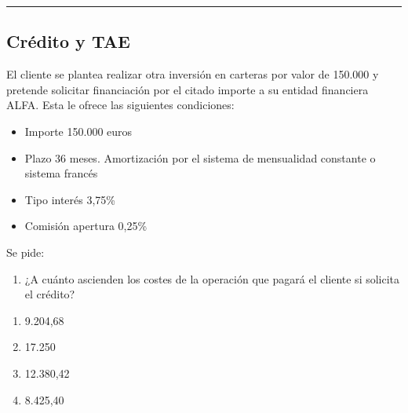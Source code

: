 \documentclass[
  letterpaper,
  DIV=11,
  numbers=noendperiod]{scrartcl}
\providecommand{\tightlist}{%
  \setlength{\itemsep}{0pt}\setlength{\parskip}{0pt}}\usepackage{longtable,booktabs,array}
\begin{document}
\begin{center}\rule{0.5\linewidth}{0.5pt}\end{center}

\hypertarget{cruxe9dito-y-tae}{%
\subsection{Crédito y TAE}\label{cruxe9dito-y-tae}}

El cliente se plantea realizar otra inversión en carteras por valor de
150.000 y pretende solicitar financiación por el citado importe a su
entidad financiera ALFA. Esta le ofrece las siguientes condiciones:

\begin{itemize}
\item
  Importe 150.000 euros
\item
  Plazo 36 meses. Amortización por el sistema de mensualidad constante o
  sistema francés
\item
  Tipo interés 3,75\%
\item
  Comisión apertura 0,25\%
\end{itemize}

Se pide:

\begin{enumerate}
\def\labelenumi{\arabic{enumi}.}
\tightlist
\item
  ¿A cuánto ascienden los costes de la operación que pagará el cliente
  si solicita el crédito?
\end{enumerate}

\begin{enumerate}
\def\labelenumi{\alph{enumi}.}
\item
  9.204,68
\item
  17.250
\item
  12.380,42
\item
  8.425,40
\end{enumerate}
\end{document}

